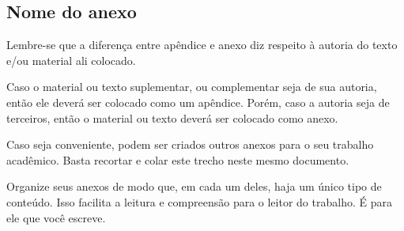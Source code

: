 
\begin{anexosenv}
    \partanexos


    \chapter{Nome do anexo}
    \label{chap_anexo_a}

    Lembre-se que a diferença entre apêndice e anexo diz respeito à autoria do texto e/ou material ali colocado.

    Caso o material ou texto suplementar, ou complementar seja de sua autoria, então ele deverá ser colocado como um apêndice.
    Porém, caso a autoria seja de terceiros, então o material ou texto deverá ser colocado como anexo.

    Caso seja conveniente, podem ser criados outros anexos para o seu trabalho acadêmico.
    Basta recortar e colar este trecho neste mesmo documento.

    Organize seus anexos de modo que, em cada um deles, haja um único tipo de conteúdo.
    Isso facilita a leitura e compreensão para o leitor do trabalho. É para ele que você escreve.

\end{anexosenv}
